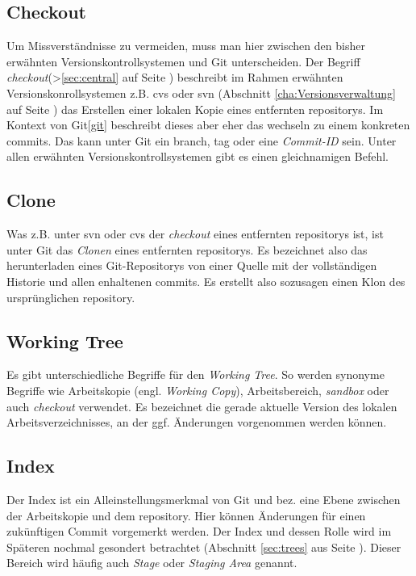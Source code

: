 \subsection{Checkout}\label{sec:checkout}
Um Missverständnisse zu vermeiden, muss man hier zwischen den bisher erwähnten
Versionskontrollsystemen und Git unterscheiden. Der Begriff
\textit{checkout}(>\ref{sec:central} auf Seite \pageref{sec:central})
beschreibt im Rahmen erwähnten Versionskonrollsystemen z.B. \acrshort{cvs}
oder \acrshort{svn} (Abschnitt \ref{cha:Versionsverwaltung} auf Seite
\pageref{cha:Versionsverwaltung}) das Erstellen einer lokalen Kopie eines
entfernten \glspl{repository}. Im Kontext von Git\ref{git} beschreibt dieses
aber eher das wechseln zu einem konkreten \glspl{commit}. Das kann unter Git
ein \gls{branch}, \gls{tag} oder eine \textit{Commit-ID} sein. Unter allen
erwähnten Versionskontrollsystemen gibt es einen gleichnamigen Befehl.

\subsection{Clone}\label{sec:clone}
Was z.B. unter \acrshort{svn} oder \acrshort{cvs} der \textit{checkout} eines
entfernten \glspl{repository} ist, ist unter Git das \textit{Clonen} eines
entfernten \glspl{repository}. Es bezeichnet also das herunterladen eines
Git-Repositorys von einer Quelle mit der vollständigen Historie und allen
enhaltenen \glspl{commit}. Es erstellt also sozusagen einen Klon des
ursprünglichen \gls{repository}.\cite[S.~21]{gitosp}

\subsection{Working Tree}\label{sec:workingtree} Es gibt unterschiedliche
Begriffe für den \textit{Working Tree}. So werden synonyme Begriffe wie
Arbeitskopie (engl. \textit{Working Copy}), Arbeitsbereich, \textit{sandbox}
oder auch \textit{checkout} verwendet. Es bezeichnet die gerade aktuelle
Version des lokalen Arbeitsverzeichnisses, an der ggf.  Änderungen vorgenommen
werden können.\cite[S.~20]{gitosp}

\subsection{Index}\label{sec:index}
Der Index ist ein Alleinstellungsmerkmal von Git und bez. eine Ebene zwischen
der Arbeitskopie und dem \gls{repository}. Hier können Änderungen für einen
zukünftigen Commit vorgemerkt werden\cite[S.~20]{gitosp}. Der Index und dessen
Rolle wird im Späteren nochmal gesondert betrachtet (Abschnitt \ref{sec:trees}
aus Seite \pageref{sec:trees}). Dieser Bereich wird häufig auch \textit{Stage}
oder \textit{Staging Area} genannt\cite[S.~11]{progit}.

